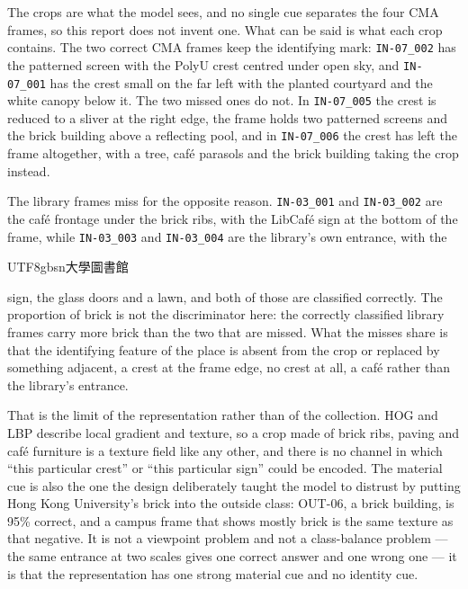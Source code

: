 \documentclass[11pt,a4paper]{article}
\begin{document}
The crops are what the model sees, and no single cue separates the four CMA frames, so this report does not invent one. What can be said is what each crop contains. The two correct CMA frames keep the identifying mark: \texttt{IN-\allowbreak{}07\_\allowbreak{}002} has the patterned screen with the PolyU crest centred under open sky, and \texttt{IN-\allowbreak{}07\_\allowbreak{}001} has the crest small on the far left with the planted courtyard and the white canopy below it. The two missed ones do not. In \texttt{IN-\allowbreak{}07\_\allowbreak{}005} the crest is reduced to a sliver at the right edge, the frame holds two patterned screens and the brick building above a reflecting pool, and in \texttt{IN-\allowbreak{}07\_\allowbreak{}006} the crest has left the frame altogether, with a tree, café parasols and the brick building taking the crop instead.

The library frames miss for the opposite reason. \texttt{IN-\allowbreak{}03\_\allowbreak{}001} and \texttt{IN-\allowbreak{}03\_\allowbreak{}002} are the café frontage under the brick ribs, with the LibCafé sign at the bottom of the frame, while \texttt{IN-\allowbreak{}03\_\allowbreak{}003} and \texttt{IN-\allowbreak{}03\_\allowbreak{}004} are the library's own entrance, with the \begin{CJK*}{UTF8}{gbsn}大學圖書館\end{CJK*} sign, the glass doors and a lawn, and both of those are classified correctly. The proportion of brick is not the discriminator here: the correctly classified library frames carry more brick than the two that are missed. What the misses share is that the identifying feature of the place is absent from the crop or replaced by something adjacent, a crest at the frame edge, no crest at all, a café rather than the library's entrance.

That is the limit of the representation rather than of the collection. HOG and LBP describe local gradient and texture, so a crop made of brick ribs, paving and café furniture is a texture field like any other, and there is no channel in which ``this particular crest'' or ``this particular sign'' could be encoded. The material cue is also the one the design deliberately taught the model to distrust by putting Hong Kong University's brick into the outside class: OUT-06, a brick building, is 95\% correct, and a campus frame that shows mostly brick is the same texture as that negative. It is not a viewpoint problem and not a class-balance problem --- the same entrance at two scales gives one correct answer and one wrong one --- it is that the representation has one strong material cue and no identity cue.
\end{document}
